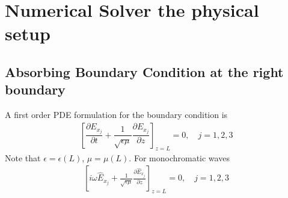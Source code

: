 \documentclass[twocolumn,secnumarabic,amssymb, nobibnotes, aps, prd]{revtex4-1}
\begin{document}
\section{Numerical Solver the physical setup }
\subsection{Absorbing Boundary Condition at the right boundary}
 A first order PDE formulation for the boundary condition is
\begin{align}
\label{eqns:1_D-temporal-traveling-wave-bc}
\left[\dfrac{\partial E_{x_j}}{\partial t} +  \dfrac{1}{\sqrt{\epsilon \mu}}\dfrac{\partial E_{x_j}}{\partial z} \right ]_{z=L} = 0, \quad j=1,2,3
\end{align}
Note that $\epsilon=\epsilon(L)$, $\mu = \mu(L)$. For monochromatic waves
\begin{align}
\label{eqns:1_D-mc-traveling-wave-bc}
\left [ i \omega \hat{E}_{x_j} +  \frac{1}{\sqrt{\epsilon \mu}} \frac{\partial \hat{E}_{x_j}}{\partial z} \right ]_{z=L} = 0, \quad j=1,2,3
\end{align}
\end{document}
